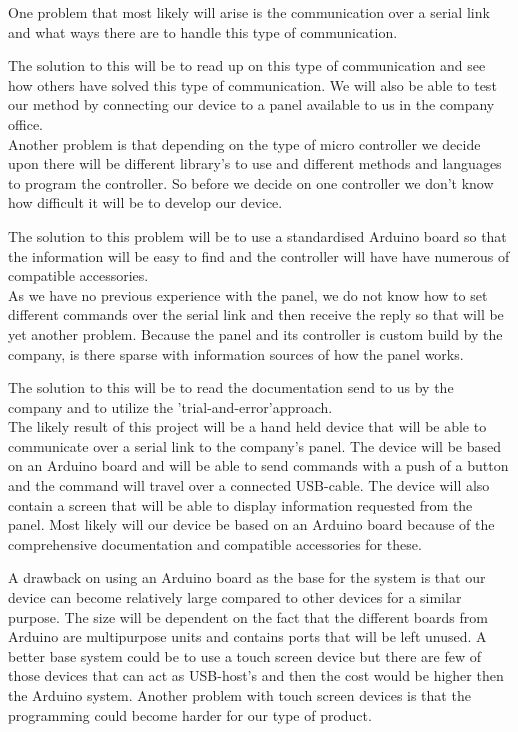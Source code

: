 \documentclass[a4paper]{article}
\begin{document}
        \noindent One problem that most likely will arise is the communication over a serial link and what ways there are to handle this type of communication.

        The solution to this will be to read up on this type of communication and see how others have solved this type of communication. We will also be able to test our method by connecting our device to a panel available to us in the company office.\\

        \noindent Another problem is that depending on the type of micro controller we decide upon there will be different library's to use and different methods and languages to program the controller. So before we decide on one controller we don't know how difficult it will be to develop our device.

        The solution to this problem will be to use a standardised Arduino board so that the information will be easy to find and the controller will have have numerous of compatible accessories. \\

        \noindent As we have no previous experience with the panel, we do not know how to set different commands over the serial link and then receive the reply so that will be yet another problem. Because the panel and its controller is custom build by the company, is there sparse with information sources of how the panel works.

        The solution to this will be to read the documentation send to us by the company and to utilize the 'trial-and-error'approach. \\

        \noindent The likely result of this project will be a hand held device that will be able to communicate over a serial link to the company's panel. The device will be based on an Arduino board and will be able to send commands with a push of a button and the command will travel over a connected USB-cable. The device will also contain a screen that will be able to display information requested from the panel. Most likely will our device be based on an Arduino board because of the comprehensive documentation and compatible accessories for these.

        A drawback on using an Arduino board as the base for the system is that our device can become relatively large compared to other devices for a similar purpose. The size will be dependent on the fact that the different boards from Arduino are multipurpose units and contains ports that will be left unused. A better base system could be to use a touch screen device but there are few of those devices that can act as USB-host's and then the cost would be higher then the Arduino system. Another problem with touch screen devices is that the programming could become harder for our type of product.
\end{document}
